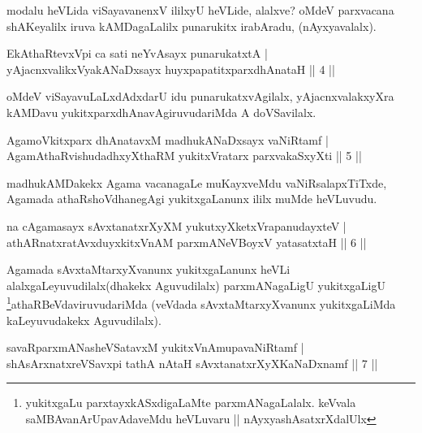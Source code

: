 \begin{artha}
modalu heVLida viSayavanenxV ililxyU heVLide, alalxve? oMdeV parxvacana shAKeyalilx iruva kAMDagaLalilx punarukitx irabAradu, (nAyxyavalalx).
\end{artha}


\begin{shl}
EkAthaRtevxV\s pi ca sati neYvAsayx punarukatxtA |\\
yAjacnxvalikxVyakANaDxsayx huyxpapatitxparxdhAnataH \hfill || 4 ||
\end{shl}

\begin{artha}
oMdeV viSayavuLaLxdAdxdarU idu punarukatxvAgilalx, yAjacnxvalakxyXra kAMDavu yukitxparxdhAnavAgiruvudariMda A doVSavilalx.
\end{artha}

\begin{shl}
AgamoVkitxparx dhAnatavxM madhukANaDxsayx vaNiRtamf |\\
AgamAthaRvishudadhxyXthaRM yukitxVratarx parxvakaSxyXti \hfill || 5 ||
\end{shl}

\begin{artha}
madhukAMDakekx Agama vacanagaLe muKayxveMdu vaNiRsalapxTiTxde, Agamada athaRshoVdhanegAgi yukitxgaLanunx ililx muMde heVLuvudu.
\end{artha}


\begin{shl}
na cA\s \s gamasayx sAvxtanatxrXyXM yukutxyXketxVrapanudayxteV |\\
athARnatxratAvxduyxkitxVnAM parxmANeVBoyxV yatasatxtaH \hfill || 6 ||
\end{shl}

\begin{artha}
Agamada sAvxtaMtarxyXvanunx yukitxgaLanunx heVLi alalxgaLeyuvudilalx(dhakekx Aguvudilalx) parxmANagaLigU yukitxgaLigU \footnote{yukitxgaLu parxtayxkASxdigaLaMte parxmANagaLalalx. keVvala saMBAvanArUpavAdaveMdu heVLuvaru || nAyxyashAsatxrXdalUlx}athaRBeVdaviruvudariMda (veVdada sAvxtaMtarxyXvanunx yukitxgaLiMda kaLeyuvudakekx Aguvudilalx).
\end{artha}


\begin{shl}
savaRparxmANasheVSatavxM yukitxVnAmupavaNiRtamf |\\
shAsArxnatxreVSavxpi tathA nAtaH sAvxtanatxrXyXKaNaDxnamf \hfill || 7 ||
\end{shl}

